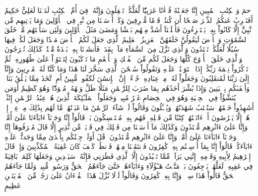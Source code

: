 حمٓ
وَٱلۡكِتَٰبِ ٱلۡمُبِينِ
إِنَّا جَعَلۡنَٰهُ قُرۡءَٰنًا عَرَبِيّٗا لَّعَلَّكُمۡ تَعۡقِلُونَ
وَإِنَّهُۥ فِيٓ أُمِّ ٱلۡكِتَٰبِ لَدَيۡنَا لَعَلِيٌّ حَكِيمٌ
أَفَنَضۡرِبُ عَنكُمُ ٱلذِّكۡرَ صَفۡحًا أَن كُنتُمۡ قَوۡمٗا مُّسۡرِفِينَ
وَكَمۡ أَرۡسَلۡنَا مِن نَّبِيّٖ فِي ٱلۡأَوَّلِينَ
وَمَا يَأۡتِيهِم مِّن نَّبِيٍّ إِلَّا كَانُواْ بِهِۦ يَسۡتَهۡزِءُونَ
فَأَهۡلَكۡنَآ أَشَدَّ مِنۡهُم بَطۡشٗا وَمَضَىٰ مَثَلُ ٱلۡأَوَّلِينَ
وَلَئِن سَأَلۡتَهُم مَّنۡ خَلَقَ ٱلسَّمَٰوَٰتِ وَٱلۡأَرۡضَ لَيَقُولُنَّ خَلَقَهُنَّ ٱلۡعَزِيزُ ٱلۡعَلِيمُ
ٱلَّذِي جَعَلَ لَكُمُ ٱلۡأَرۡضَ مَهۡدٗا وَجَعَلَ لَكُمۡ فِيهَا سُبُلٗا لَّعَلَّكُمۡ تَهۡتَدُونَ
وَٱلَّذِي نَزَّلَ مِنَ ٱلسَّمَآءِ مَآءَۢ بِقَدَرٖ فَأَنشَرۡنَا بِهِۦ بَلۡدَةٗ مَّيۡتٗاۚ كَذَٰلِكَ تُخۡرَجُونَ
وَٱلَّذِي خَلَقَ ٱلۡأَزۡوَٰجَ كُلَّهَا وَجَعَلَ لَكُم مِّنَ ٱلۡفُلۡكِ وَٱلۡأَنۡعَٰمِ مَا تَرۡكَبُونَ
لِتَسۡتَوُۥاْ عَلَىٰ ظُهُورِهِۦ ثُمَّ تَذۡكُرُواْ نِعۡمَةَ رَبِّكُمۡ إِذَا ٱسۡتَوَيۡتُمۡ عَلَيۡهِ وَتَقُولُواْ سُبۡحَٰنَ ٱلَّذِي سَخَّرَ لَنَا هَٰذَا وَمَا كُنَّا لَهُۥ مُقۡرِنِينَ
وَإِنَّآ إِلَىٰ رَبِّنَا لَمُنقَلِبُونَ
وَجَعَلُواْ لَهُۥ مِنۡ عِبَادِهِۦ جُزۡءًاۚ إِنَّ ٱلۡإِنسَٰنَ لَكَفُورٞ مُّبِينٌ
أَمِ ٱتَّخَذَ مِمَّا يَخۡلُقُ بَنَاتٖ وَأَصۡفَىٰكُم بِٱلۡبَنِينَ
وَإِذَا بُشِّرَ أَحَدُهُم بِمَا ضَرَبَ لِلرَّحۡمَٰنِ مَثَلٗا ظَلَّ وَجۡهُهُۥ مُسۡوَدّٗا وَهُوَ كَظِيمٌ
أَوَمَن يُنَشَّؤُاْ فِي ٱلۡحِلۡيَةِ وَهُوَ فِي ٱلۡخِصَامِ غَيۡرُ مُبِينٖ
وَجَعَلُواْ ٱلۡمَلَـٰٓئِكَةَ ٱلَّذِينَ هُمۡ عِبَٰدُ ٱلرَّحۡمَٰنِ إِنَٰثًاۚ أَشَهِدُواْ خَلۡقَهُمۡۚ سَتُكۡتَبُ شَهَٰدَتُهُمۡ وَيُسۡـَٔلُونَ
وَقَالُواْ لَوۡ شَآءَ ٱلرَّحۡمَٰنُ مَا عَبَدۡنَٰهُمۗ مَّا لَهُم بِذَٰلِكَ مِنۡ عِلۡمٍۖ إِنۡ هُمۡ إِلَّا يَخۡرُصُونَ
أَمۡ ءَاتَيۡنَٰهُمۡ كِتَٰبٗا مِّن قَبۡلِهِۦ فَهُم بِهِۦ مُسۡتَمۡسِكُونَ
بَلۡ قَالُوٓاْ إِنَّا وَجَدۡنَآ ءَابَآءَنَا عَلَىٰٓ أُمَّةٖ وَإِنَّا عَلَىٰٓ ءَاثَٰرِهِم مُّهۡتَدُونَ
وَكَذَٰلِكَ مَآ أَرۡسَلۡنَا مِن قَبۡلِكَ فِي قَرۡيَةٖ مِّن نَّذِيرٍ إِلَّا قَالَ مُتۡرَفُوهَآ إِنَّا وَجَدۡنَآ ءَابَآءَنَا عَلَىٰٓ أُمَّةٖ وَإِنَّا عَلَىٰٓ ءَاثَٰرِهِم مُّقۡتَدُونَ
۞قَٰلَ أَوَلَوۡ جِئۡتُكُم بِأَهۡدَىٰ مِمَّا وَجَدتُّمۡ عَلَيۡهِ ءَابَآءَكُمۡۖ قَالُوٓاْ إِنَّا بِمَآ أُرۡسِلۡتُم بِهِۦ كَٰفِرُونَ
فَٱنتَقَمۡنَا مِنۡهُمۡۖ فَٱنظُرۡ كَيۡفَ كَانَ عَٰقِبَةُ ٱلۡمُكَذِّبِينَ
وَإِذۡ قَالَ إِبۡرَٰهِيمُ لِأَبِيهِ وَقَوۡمِهِۦٓ إِنَّنِي بَرَآءٞ مِّمَّا تَعۡبُدُونَ
إِلَّا ٱلَّذِي فَطَرَنِي فَإِنَّهُۥ سَيَهۡدِينِ
وَجَعَلَهَا كَلِمَةَۢ بَاقِيَةٗ فِي عَقِبِهِۦ لَعَلَّهُمۡ يَرۡجِعُونَ
بَلۡ مَتَّعۡتُ هَـٰٓؤُلَآءِ وَءَابَآءَهُمۡ حَتَّىٰ جَآءَهُمُ ٱلۡحَقُّ وَرَسُولٞ مُّبِينٞ
وَلَمَّا جَآءَهُمُ ٱلۡحَقُّ قَالُواْ هَٰذَا سِحۡرٞ وَإِنَّا بِهِۦ كَٰفِرُونَ
وَقَالُواْ لَوۡلَا نُزِّلَ هَٰذَا ٱلۡقُرۡءَانُ عَلَىٰ رَجُلٖ مِّنَ ٱلۡقَرۡيَتَيۡنِ عَظِيمٍ

